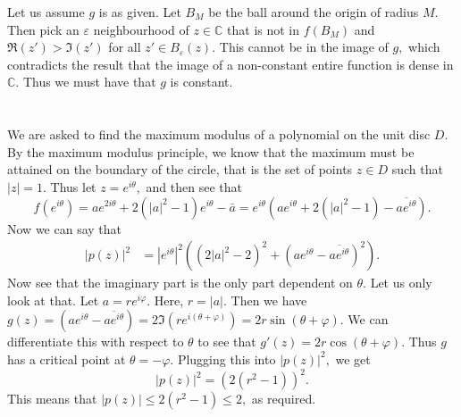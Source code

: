 \documentclass{article}
\begin{document}
Let us assume $g$ is as given. Let $B_M$ be the ball around the origin of radius $M.$ Then pick an $\varepsilon$ neighbourhood of $z \in \mathbb{C}$ that is 
not in $f(B_M)$ and $\Re(z') > \Im(z')$ for all $z' \in B_{\varepsilon}(z).$ This cannot be in the image of $g,$ which contradicts the result that the image 
of a non-constant entire function is dense in $\mathbb{C}.$ Thus we must have that $g$ is constant.   
\section{} %
We are asked to find the maximum modulus of a polynomial on the unit disc $D.$ By the maximum modulus principle, we know that the maximum must be attained 
on the boundary of the circle, that is the set of points $z \in D$ such that $|z|=1.$ Thus let $z=e^{i\theta},$ and then see that $$f(e^{i\theta})= 
ae^{2i\theta} + 2(|a|^2-1)e^{i\theta} -\bar{a}= e^{i\theta} \left( ae^{i\theta} + 2(|a|^2-1) -\overline{ae^{i\theta}} \right).$$ 
Now we can say that 
\begin{align*}
	|p(z)|^2 &= |e^{i\theta}|^2 \left(\left(2|a|^2-2\right)^2+ \left( ae^{i\theta}-\overline{ae^{i\theta}} \right)^2 \right).
\end{align*}
Now see that the imaginary part is the only part dependent on $\theta.$ Let us only look at that. Let $a= re^{i\varphi}.$ Here, $r=|a|.$ Then we have 
$g(z)= \left( ae^{i\theta}-\overline{ae^{i\theta}} \right)= 2 \Im\left(re^{i(\theta + \varphi)}\right)= 2r \sin (\theta + \varphi).$ We can differentiate 
this with respect to $\theta$ to see that $g'(z)= 2r \cos(\theta + \varphi).$ Thus $g$ has a critical point at $\theta= - \varphi.$ Plugging this into 
$|p(z)|^2,$ we get $$	|p(z)|^2 = \left(2(r^2-1)\right)^2 .$$ This means that $|p(z)| \leq 2(r^2-1) \leq 2,$ as required.
\end{document}
